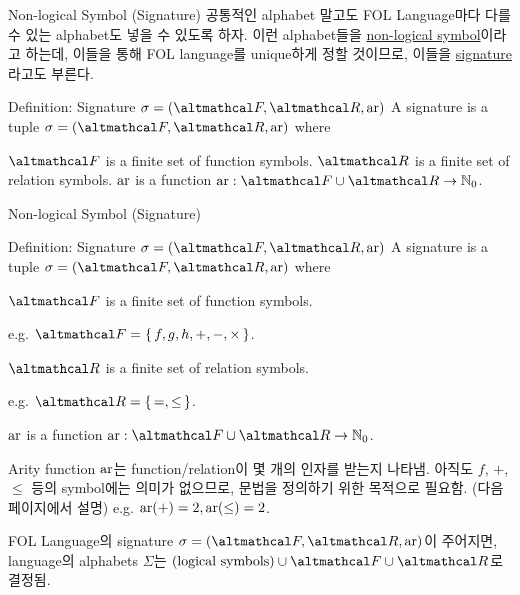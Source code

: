 \documentclass[../231120_msquare_computational-logic.tex]{subfiles}
\begin{document}
\begin{frame}{Non-logical Symbol (Signature)}
    공통적인 alphabet 말고도 FOL Language마다 다를 수 있는 alphabet도 넣을 수 있도록 하자.
    이런 alphabet들을 \ul{non-logical symbol}이라고 하는데,
    이들을 통해 FOL language를 unique하게 정할 것이므로, 이들을 \ul{signature}라고도 부른다.
    \pause

    \begin{block}{Definition: Signature \(\sigma = (\mcal F, \mcal R, \mrm{ar})\)}
        A signature is a tuple \(\sigma = (\mcal F, \mcal R, \mrm{ar})\) where
        \begin{itemize}
            \ii \(\mcal F\) is a finite set of \alert{function symbols}.
            \ii \(\mcal R\) is a finite set of \alert{relation symbols}.
            \ii \(\mathrm{ar}\) is a function \(\mrm{ar}: \mcal F \cup \mcal R \to \NN_0\).
        \end{itemize}
    \end{block}
\end{frame}

\begin{frame}{Non-logical Symbol (Signature)}
    \begin{block}{Definition: Signature \(\sigma = (\mcal F, \mcal R, \mrm{ar})\)}
        A signature is a tuple \(\sigma = (\mcal F, \mcal R, \mrm{ar})\) where
        \begin{itemize}
            \ii \(\mcal F\) is a finite set of \alert{function symbols}.
                \begin{itemize}
                    \ii e.g. \(\mcal F = \{\,f,g,h,+,-,\times\,\}\).
                \end{itemize}
            \ii \(\mcal R\) is a finite set of \alert{relation symbols}.
                \begin{itemize}
                    \ii e.g. \(\mcal R = \{\,=,\le\,\}\).
                \end{itemize}
            \ii \(\mathrm{ar}\) is a function \(\mrm{ar}: \mcal F \cup \mcal R \to \NN_0\).
                \begin{itemize}
                    \ii \alert{Arity} function \(\mathrm{ar}\)는
                        function/relation이 몇 개의 인자를 받는지 나타냄.
                    \ii 아직도 \(f\), \(+\), \(\le\) 등의 symbol에는 의미가 없으므로,
                        문법을 정의하기 위한 목적으로 필요함.
                        (다음 페이지에서 설명)
                    \ii e.g. \(\mathrm{ar}(+) = 2, \mathrm{ar}(\le) = 2\).
                \end{itemize}
        \end{itemize}
    \end{block}
    
    \pause
    \begin{alertblock}{}
        FOL Language의 signature \(\sigma = (\mcal F, \mcal R, \mrm{ar})\)이 주어지면,
        language의 alphabets \(\Sigma\)는
        \alert{\((\text{logical symbols}) \cup \mcal F \cup \mcal R\)}로 결정됨.
    \end{alertblock}
\end{frame}
\end{document}
